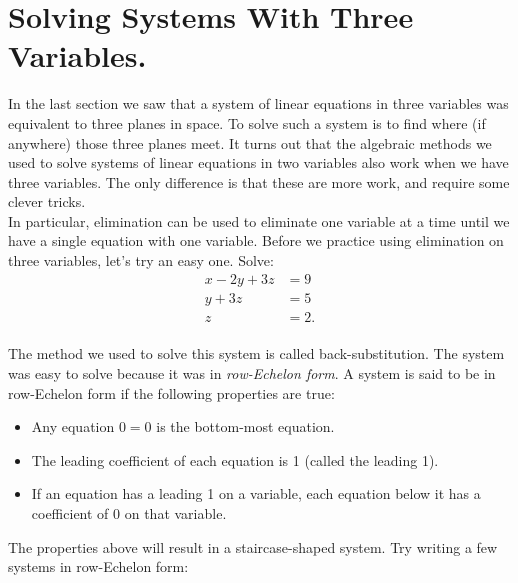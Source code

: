 \documentclass[12pt,fleqn]{book}
\begin{document}
\chapter{Solving Systems With Three Variables.}
In the last section we saw that a system of linear equations in three variables was equivalent to three planes in space.  To solve such a system is to find where (if anywhere) those three planes meet.  It turns out that the algebraic methods we used to solve systems of linear equations in two variables also work when we have three variables.  The only difference is that these are more work, and require some clever tricks.
\\[1em]
In particular, elimination can be used to eliminate one variable at a time until we have a single equation with one variable.  Before we practice using elimination on three variables, let's try an easy one.  Solve:
\begin{align*}
	x-2y+3z&=9\\
	y+3z&=5\\
	z&=2.
\end{align*}
\\[2in]
The method we used to solve this system is called back-substitution.  The system was easy to solve because it was in \emph{row-Echelon form}.  A system is said to be in row-Echelon form if the following properties are true:
\begin{itemize}
	\item Any equation $0=0$ is the bottom-most equation.
	\item The leading coefficient of each equation is 1 (called the leading 1).
	\item If an equation has a leading 1 on a variable, each equation below it has a coefficient of 0 on that variable.
\end{itemize}
The properties above will result in a staircase-shaped system.  Try writing a few systems in row-Echelon form:
\vspace{2in}
\end{document}
